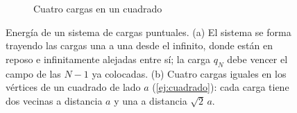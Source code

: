 \begin{figure}[t]
\begin{subfigure}[b]{0.44\textwidth}
\caption{Cuatro cargas en un cuadrado}
\end{subfigure}
\caption{Energía de un sistema de cargas puntuales. (a) El sistema se forma trayendo las cargas una a una desde el
infinito, donde están en reposo e infinitamente alejadas entre sí; la carga $q_N$ debe vencer el campo de las $N-1$ ya
colocadas. (b) Cuatro cargas iguales en los vértices de un cuadrado de lado $a$ (\cref{ej:cuadrado}): cada carga
tiene dos vecinas a distancia $a$ y una a distancia $\sqrt2\,a$.}
\label{fig:cargas}
\end{figure}
